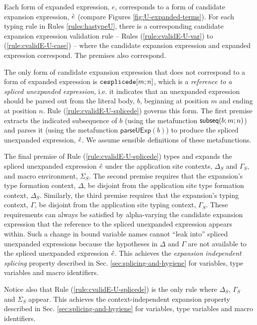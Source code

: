 Each form of expanded expression, $e$, corresponds to a form of candidate expansion expression, $\grave{e}$ (compare Figures \ref{fig:U-expanded-terms}). For each typing rule in Rules \ref{rules:hastypeU}, there is a corresponding candidate expansion expression validation rule -- Rules (\ref{rule:cvalidE-U-var}) to (\ref{rule:cvalidE-U-case}) -- where the candidate expansion expression and expanded expression correspond. The premises also correspond.

The only form of candidate expansion expression that does not correspond to a form of expanded expression is $\texttt{cesplicede}[m; n]$, which is a \emph{reference to a spliced unexpanded expression}, i.e. it indicates that an unexpanded expression should be parsed out from the literal body, $b$, beginning at position $m$ and ending at position $n$. Rule (\ref{rule:cvalidE-U-splicede}) governs this form. The first premise extracts the indicated subsequence of $b$ (using the metafunction $\mathsf{subseq}(b; m; n)$) and parses it (using the metafunction $\mathsf{parseUExp}(b)$) to produce the spliced unexpanded expression, $\hat{e}$. We assume sensible definitions of these metafunctions.

The final premise of Rule (\ref{rule:cvalidE-U-splicede}) types and expands the spliced unexpanded expression $\hat{e}$ under the application site contexts, $\Delta_S$ and $\Gamma_S$, and macro environment, $\Sigma_S$. The second premise requires that the expansion's type formation context, $\Delta$, be disjoint from the application site type formation context, $\Delta_S$. Similarly, the third premise requires that the expansion's typing context, $\Gamma$, be disjoint from the application site typing context, $\Gamma_S$. These requirements can always be satisfied by alpha-varying the candidate expansion expression that the reference to the spliced unexpanded expression appears within. Such a change in bound variable names cannot ``leak into'' spliced unexpanded expressions because the hypotheses in $\Delta$ and $\Gamma$ are not  available to the spliced unexpanded expression $\hat{e}$. This achieves the \emph{expansion independent splicing} property described in Sec. \ref{sec:splicing-and-hygiene} for variables, type variables and macro identifiers.

Notice also that Rule (\ref{rule:cvalidE-U-splicede}) is the only rule where $\Delta_S$, $\Gamma_S$ and $\Sigma_S$ appear. This achieves the context-independent expansion property described in Sec. \ref{sec:splicing-and-hygiene} for variables, type variables and macro identifiers.


